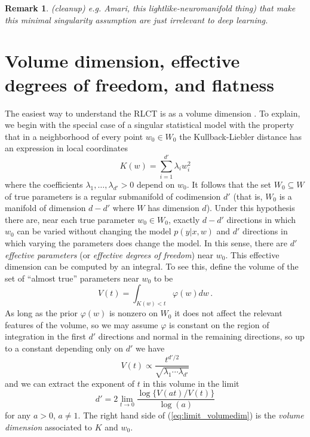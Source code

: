\documentclass{article} %
\def\be{\begin{equation}}
\def\ee{\end{equation}}
\newtheorem{remark}[theorem]{Remark}
\begin{document}
\begin{remark} (cleanup)
e.g. Amari, this lightlike-neuromanifold thing) that make this minimal singularity assumption are just irrelevant to deep learning.
\end{remark}

\newpage

\section{Volume dimension, effective degrees of freedom, and flatness}
\label{section:no_flat_minima}

The easiest way to understand the RLCT is as a volume dimension \citep[Theorem 7.1]{watanabe_algebraic_2009}. To explain, we begin with the special case of a singular statistical model with the property that in a neighborhood of every point $w_0 \in W_0$ the Kullback-Liebler distance has an expression in local coordinates
\begin{equation}\label{eq:local_Kw}
K(w) = \sum_{i=1}^{d'} \lambda_i w_i^2
\end{equation}
where the coefficients $\lambda_1,\ldots,\lambda_{d'} > 0$ depend on $w_0$. It follows that the set $W_0 \subseteq W$ of true parameters is a regular submanifold of codimension $d'$ (that is, $W_0$ is a manifold of dimension $d - d'$ where $W$ has dimension $d$). Under this hypothesis there are, near each true parameter $w_0 \in W_0$, exactly $d - d'$ directions in which $w_0$ can be varied without changing the model $p(y|x,w)$ and $d'$ directions in which varying the parameters does change the model. In this sense, there are $d'$ \emph{effective parameters} (or \emph{effective degrees of freedom}) near $w_0$. This effective dimension can be computed by an integral. To see this, define the volume of the set of ``almost true'' parameters near $w_0$ to be
\begin{equation}\label{eq:true_param}
V(t) = \int_{K(w) < t} \varphi(w) dw\,.
\end{equation}
As long as the prior $\varphi(w)$ is nonzero on $W_0$ it does not affect the relevant features of the volume, so we may assume $\varphi$ is constant on the region of integration in the first $d'$ directions and normal in the remaining directions, so up to a constant depending only on $d'$ we have
\begin{equation}\label{eq:volume_singular}
V(t) \propto \frac{t^{d'/2}}{\sqrt{\lambda_1 \cdots \lambda_{d'}}}
\end{equation}
and we can extract the exponent of $t$ in this volume in the limit
\be\label{eq:limit_volumedim}
d' = 2 \lim_{t \to 0} \frac{\log\big\{V(at)/V(t)\big\}}{\log(a)}
\ee
for any $a > 0$, $a \neq 1$. The right hand side of (\ref{eq:limit_volumedim}) is the \emph{volume dimension} associated to $K$ and $w_0$.
\end{document}
